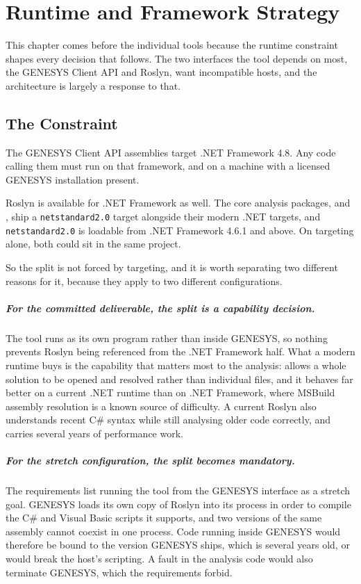 \chapter{Runtime and Framework Strategy}
\label{ch:runtime}

This chapter comes before the individual tools because the runtime constraint
shapes every decision that follows. The two interfaces the tool depends on most,
the GENESYS Client API and Roslyn, want incompatible hosts, and the architecture
is largely a response to that.

\section{The Constraint}

The GENESYS Client API assemblies target .NET Framework 4.8. Any code calling
them must run on that framework, and on a machine with a licensed GENESYS
installation present.

Roslyn is available for .NET Framework as well. The core analysis packages,
 and ,
ship a \texttt{netstandard2.0} target alongside their modern .NET targets, and
\texttt{netstandard2.0} is loadable from .NET Framework 4.6.1 and above. On
targeting alone, both could sit in the same project.

So the split is not forced by targeting, and it is worth separating two different
reasons for it, because they apply to two different configurations.

\paragraph{For the committed deliverable, the split is a capability decision.}
The tool runs as its own program rather than inside GENESYS, so nothing prevents
Roslyn being referenced from the .NET Framework half. What a modern runtime buys
is the capability that matters most to the analysis:
 allows a whole solution to be
opened and resolved rather than individual files, and it behaves far better on a
current .NET runtime than on .NET Framework, where MSBuild assembly resolution is
a known source of difficulty. A current Roslyn also understands recent C\# syntax
while still analysing older code correctly, and carries several years of
performance work.

\paragraph{For the stretch configuration, the split becomes mandatory.}
The requirements list running the tool from the GENESYS interface as a stretch
goal. GENESYS loads its own copy of Roslyn into its process in order to compile
the C\# and Visual Basic scripts it supports, and two versions of the same
assembly cannot coexist in one process. Code running inside GENESYS would
therefore be bound to the version GENESYS ships, which is several years old, or
would break the host's scripting. A fault in the analysis code would also
terminate GENESYS, which the requirements forbid.


